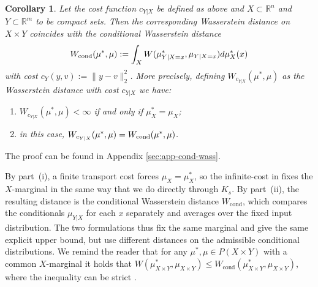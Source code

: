 \documentclass{article}
\newcommand{\R}{\mathbb{R}} %
\newtheorem{corollary}{Corollary}[theorem]
\theoremstyle{definition}
\theoremstyle{remarksty}
\begin{document}
\begin{corollary}\label{cor:w-cond}
Let the cost function $c_{Y|X}$ be defined as above and $X \subset \R^n$ and $Y \subset \R^m$ to be compact sets. Then the corresponding Wasserstein distance on $X \times Y$ coincides with the \emph{conditional Wasserstein distance}
\begin{align*}
    W_{\rm cond}(\mu^*, \mu) := \int_X W(\mu_{Y|X=x}^*, \mu_{Y|X=x}) d\mu_X^*(x)
\end{align*}
with cost $c_Y(y,v):=\|y-v\|^2_2$.  
More precisely, defining  $W_{c_{Y|X}}(\mu^*, \mu)$ as the  Wasserstein distance with cost $c_{Y|X}$ we have:
\begin{enumerate}[label=\roman*)]
    \item $W_{c_{Y|X}}(\mu^*, \mu)< \infty$ if and only if $\mu_X^* = \mu_X$;
    \item in this case, $W_{c_{Y|X}}(\mu^*, \mu) = W_{\rm cond}(\mu^*, \mu)$.
\end{enumerate}
\end{corollary}
The proof can be found in Appendix \ref{sec:app-cond-wass}.

By part~(i), a finite transport cost forces $\mu_X=\mu_X^*$, so the infinite-cost in \cite{blanchet_robust_2019} fixes the $X$-marginal in the same way that we do directly through $K_s$. By part~(ii), the resulting distance is the conditional Wasserstein distance $W_\text{cond}$, which compares the conditionals $\mu_{Y|X}$ for each $x$ separately and averages over the fixed input distribution. The two formulations thus fix the same marginal and give the same explicit upper bound, but use different distances on the admissible conditional distributions. We remind the reader that for any $\mu^*,\mu\in P(X\times Y)$ with a common $X$-marginal it holds that $W(\mu_{X\times Y}^* ,\mu_{X\times Y}) \leq W_\text{cond} (\mu_{X\times Y}^* ,\mu_{X\times Y})$, where the inequality can be strict \cite{chemseddine_conditional_2025}. 
\end{document}

